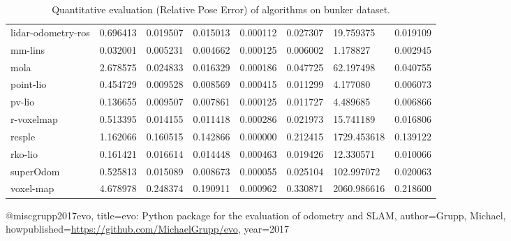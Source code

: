 \begin{table}[]
{\begin{tabular}{llllllll}
		lidar-odometry-ros & 0.696413 & 0.019507 & 0.015013 & 0.000112 & 0.027307 & 19.759375 & 0.019109 \\
		mm-lins & 0.032001 & 0.005231 & 0.004662 & 0.000125 & 0.006002 & 1.178827 & 0.002945 \\
		mola & 2.678575 & 0.024833 & 0.016329 & 0.000186 & 0.047725 & 62.197498 & 0.040755 \\
		point-lio & 0.454729 & 0.009528 & 0.008569 & 0.000415 & 0.011299 & 4.177080 & 0.006073 \\
		pv-lio & 0.136655 & 0.009507 & 0.007861 & 0.000125 & 0.011727 & 4.489685 & 0.006866 \\
		r-voxelmap & 0.513395 & 0.014155 & 0.011418 & 0.000286 & 0.021973 & 15.741189 & 0.016806 \\
		resple & 1.162066 & 0.160515 & 0.142866 & 0.000000 & 0.212415 & 1729.453618 & 0.139122 \\
		rko-lio & 0.161421 & 0.016614 & 0.014448 & 0.000463 & 0.019426 & 12.330571 & 0.010066 \\
		superOdom & 0.525813 & 0.015089 & 0.008673 & 0.000055 & 0.025104 & 102.997072 & 0.020063 \\
		voxel-map & 4.678978 & 0.248374 & 0.190911 & 0.000962 & 0.330871 & 2060.986616 & 0.218600 \\
        	\end{tabular}%
        }
        	\caption{Quantitative evaluation (Relative Pose Error\cite{grupp2017evo}) of algorithms on bunker dataset.}
        	\label{table3}
\end{table}

@misc{grupp2017evo,
  title={evo: Python package for the evaluation of odometry and SLAM},
  author={Grupp, Michael},
  howpublished={\url{https://github.com/MichaelGrupp/evo}},
  year={2017}
}
